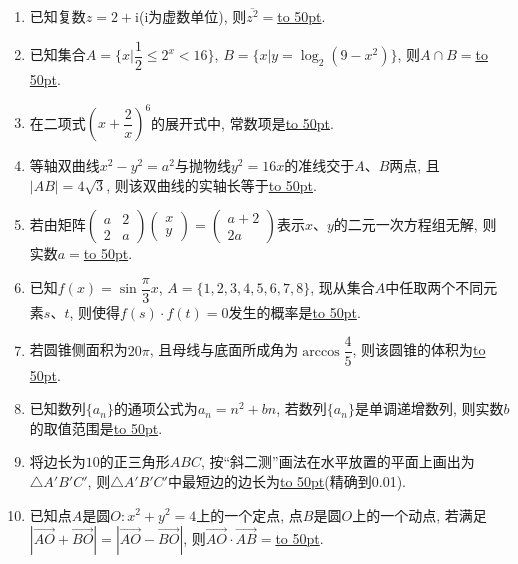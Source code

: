 \documentclass[10pt,a4paper]{article}
\newcommand{\blank}[1]{\underline{\hbox to #1pt{}}}
\begin{document}
\begin{enumerate}[1.]
\item 已知复数$z=2+\mathrm{i}$($\mathrm{i}$为虚数单位), 则$\overline{{z^2}}=$\blank{50}.
\item 已知集合$A=\{x|\dfrac12\le {2^x}<16\}$, $B=\{x|y=\log _2(9-x^2)\}$, 则$A\cap B=$\blank{50}.
\item 在二项式$(x+\dfrac2x)^6$的展开式中, 常数项是\blank{50}.
\item 等轴双曲线$x^2-y^2=a^2$与抛物线$y^2=16x$的准线交于$A$、$B$两点, 且$|AB|=4\sqrt3$, 则该双曲线的实轴长等于\blank{50}.
\item 若由矩阵$\begin{pmatrix}a & 2 \\ 2 & a\end{pmatrix}\begin{pmatrix}x \\ y\end{pmatrix}=\begin{pmatrix}a+2 \\ 2a\end{pmatrix}$表示$x$、$y$的二元一次方程组无解, 则实数$a=$\blank{50}.
\item 已知$f(x)=\sin\dfrac\pi 3x$, $A=\{1,2,3,4,5,6,7,8\}$, 现从集合$A$中任取两个不同元素$s$、$t$, 则使得$f(s)\cdot f(t)=0$发生的概率是\blank{50}.
\item 若圆锥侧面积为$20\pi$, 且母线与底面所成角为$\arccos \dfrac45$, 则该圆锥的体积为\blank{50}.
\item 已知数列$\{a_n\}$的通项公式为$a_n=n^2+bn$, 若数列$\{a_n\}$是单调递增数列, 则实数$b$的取值范围是\blank{50}.
\item 将边长为$10$的正三角形$ABC$, 按``斜二测''画法在水平放置的平面上画出为$\triangle A'B'C'$, 则$\triangle A'B'C'$中最短边的边长为\blank{50}(精确到0.01).
\item 已知点$A$是圆$O: x^2+y^2=4$上的一个定点, 点$B$是圆$O$上的一个动点, 若满足$|\overrightarrow{AO}+\overrightarrow{BO}|=|\overrightarrow{AO}-\overrightarrow{BO}|$, 则$\overrightarrow{AO}\cdot \overrightarrow{AB}=$\blank{50}.



\end{enumerate}
\end{document}
